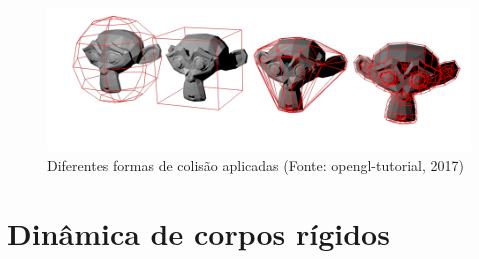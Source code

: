\begin{figure}[H]
	\centering
	\includegraphics[scale=0.4]{imagens/collision-shapes.png}
	\caption{\small Diferentes formas de colisão aplicadas (Fonte: opengl-tutorial, 2017)}
	\label{fig:collisionshapes}
\end{figure}

\section{Dinâmica de corpos rígidos}


